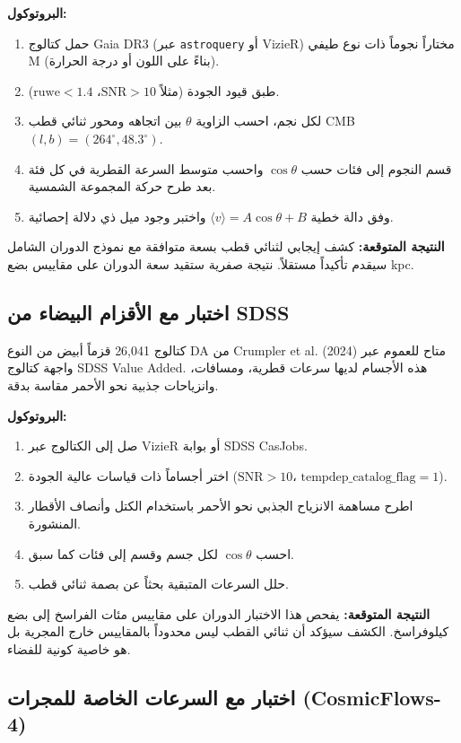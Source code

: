 \documentclass[12pt,a4paper]{article}
\begin{document}
	\textbf{البروتوكول:}
	\begin{enumerate}
		\item حمل كتالوج Gaia DR3 (عبر \texttt{astroquery} أو VizieR) مختاراً نجوماً ذات نوع طيفي M (بناءً على اللون أو درجة الحرارة).
		\item طبق قيود الجودة (مثلاً \(\mathrm{SNR} > 10\)، \(\mathrm{ruwe} < 1.4\)).
		\item لكل نجم، احسب الزاوية \(\theta\) بين اتجاهه ومحور ثنائي قطب CMB \((l,b) = (264^\circ, 48.3^\circ)\).
		\item قسم النجوم إلى فئات حسب \(\cos\theta\) واحسب متوسط السرعة القطرية في كل فئة بعد طرح حركة المجموعة الشمسية.
		\item وفق دالة خطية \(\langle v \rangle = A \cos\theta + B\) واختبر وجود ميل ذي دلالة إحصائية.
	\end{enumerate}
	
	\textbf{النتيجة المتوقعة:} كشف إيجابي لثنائي قطب بسعة متوافقة مع نموذج الدوران الشامل سيقدم تأكيداً مستقلاً. نتيجة صفرية ستقيد سعة الدوران على مقاييس بضع kpc.
	
	\subsection{اختبار مع الأقزام البيضاء من SDSS}
	
	كتالوج 26,041 قزماً أبيض من النوع DA من Crumpler et al. (2024) متاح للعموم عبر واجهة كتالوج SDSS Value Added. هذه الأجسام لديها سرعات قطرية، ومسافات، وانزياحات جذبية نحو الأحمر مقاسة بدقة.
	
	\textbf{البروتوكول:}
	\begin{enumerate}
		\item صل إلى الكتالوج عبر VizieR أو بوابة SDSS CasJobs.
		\item اختر أجساماً ذات قياسات عالية الجودة (\(\mathrm{SNR} > 10\)، \(\mathrm{tempdep\_catalog\_flag} = 1\)).
		\item اطرح مساهمة الانزياح الجذبي نحو الأحمر باستخدام الكتل وأنصاف الأقطار المنشورة.
		\item احسب \(\cos\theta\) لكل جسم وقسم إلى فئات كما سبق.
		\item حلل السرعات المتبقية بحثاً عن بصمة ثنائي قطب.
	\end{enumerate}
	
	\textbf{النتيجة المتوقعة:} يفحص هذا الاختبار الدوران على مقاييس مئات الفراسخ إلى بضع كيلوفراسخ. الكشف سيؤكد أن ثنائي القطب ليس محدوداً بالمقاييس خارج المجرية بل هو خاصية كونية للفضاء.
	
	\subsection{اختبار مع السرعات الخاصة للمجرات (CosmicFlows-4)}
	
\end{document}
